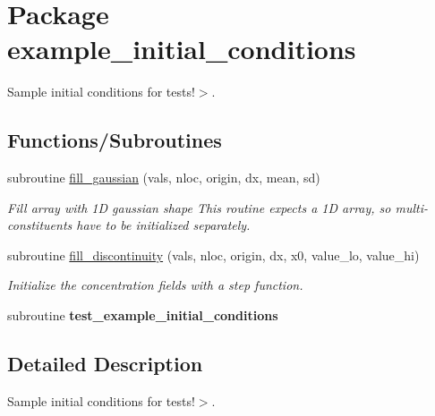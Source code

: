 \hypertarget{a00030}{
\section{Package example\_\-initial\_\-conditions}
\label{a00030}
}
Sample initial conditions for tests!$>$.  


\subsection*{Functions/Subroutines}
\begin{CompactItemize}
\item 
subroutine \hyperlink{a00030_2c47dd5d0ce7fcef026d458d648d555a}{fill\_\-gaussian} (vals, nloc, origin, dx, mean, sd)
\begin{CompactList}\small\item\em Fill array with 1D gaussian shape This routine expects a 1D array, so multi-constituents have to be initialized separately. \item\end{CompactList}\item 
\hypertarget{a00030_71681924677036456a1044d44569c143}{
subroutine \hyperlink{a00030_71681924677036456a1044d44569c143}{fill\_\-discontinuity} (vals, nloc, origin, dx, x0, value\_\-lo, value\_\-hi)}
\label{a00030_71681924677036456a1044d44569c143}

\begin{CompactList}\small\item\em Initialize the concentration fields with a step function. \item\end{CompactList}\item 
\hypertarget{a00030_9d50ce70b86db13656592d6571f36dba}{
subroutine \textbf{test\_\-example\_\-initial\_\-conditions}}
\label{a00030_9d50ce70b86db13656592d6571f36dba}

\end{CompactItemize}


\subsection{Detailed Description}
Sample initial conditions for tests!$>$. 



